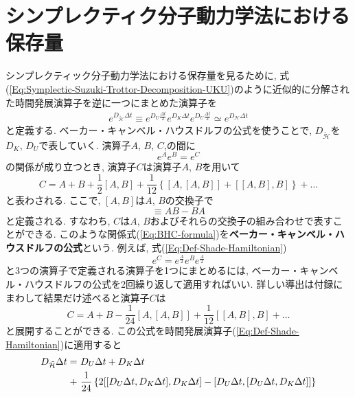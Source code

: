 \section{シンプレクティク分子動力学法における保存量}
シンプレクティック分子動力学法における保存量を見るために, 式(\ref{Eq:Symplectic-Suzuki-Trottor-Decomposition-UKU})のように近似的に分解された時間発展演算子を逆に一つにまとめた演算子を
\begin{align}
  e^{D_{\tilde{\mathcal{H}}} \Delta t}
  \equiv
  e^{D_{U} \frac{\Delta t}{2}}
  e^{D_{K} \Delta t}
  e^{D_{U} \frac{\Delta t}{2}}
  \simeq
  e^{D_{\mathcal{H}} \Delta t}
  \label{Eq:Def-Shade-Hamiltonian}
\end{align}
と定義する.
ベーカー・キャンベル・ハウスドルフの公式を使うことで, $D_{\tilde{\mathcal{H}}}$を$D_{K}$, $D_{U}$で表していく.
演算子$A$, $B$, $C$,の間に
\begin{equation}
  e^{A}e^{B} = e^{C}
\end{equation}
の関係が成り立つとき, 演算子$C$は演算子$A$, $B$を用いて
\begin{equation}
  C = A + B
    + \frac{1}{2} [A, B]
    + \frac{1}{12}
      \left\{
        [A, [A,B]] + [[A,B], B]
      \right\}
    + \ldots
  \label{Eq:BHC-formula}
\end{equation}
と表わされる. ここで, $[A, B]$は$A$, $B$の交換子で
\begin{equation}
  [A, B] \equiv AB - BA
\end{equation}
と定義される. すなわち, $C$は$A$, $B$およびそれらの交換子の組み合わせで表すことができる. 
このような関係式(\ref{Eq:BHC-formula})を\textbf{ベーカー・キャンベル・ハウスドルフの公式}という. 
例えば, 式(\ref{Eq:Def-Shade-Hamiltonian})
\begin{equation}
  e^{C} = e^{\frac{A}{2}}e^{B}e^{\frac{A}{2}}
\end{equation}
と3つの演算子で定義される演算子を1つにまとめるには, ベーカー・キャンベル・ハウスドルフの公式を2回繰り返して適用すればいい. 詳しい導出は付録にまわして結果だけ述べると演算子$C$は
\begin{equation}
  C = A + B
    - \frac{1}{24}[A, [A,B]]
    + \frac{1}{12}[[A,B], B]
    + \ldots
\end{equation}
と展開することができる.
この公式を時間発展演算子(\ref{Eq:Def-Shade-Hamiltonian})に適用すると
\begin{align}
  D_{\Tilde{\mathcal{H}}} \Delta t
  =~&
  D_{U} \Delta t + D_{K} \Delta t
  \\ \notag
  +~&
  \frac{1}{24}
  \left\{
      2[[D_{U}\Delta t, D_{K}\Delta t], D_{K} \Delta t]
    -  [D_{U}\Delta t, [D_{U}\Delta t, D_{K}\Delta t]]
  \right\}
  \notag
\end{align}

